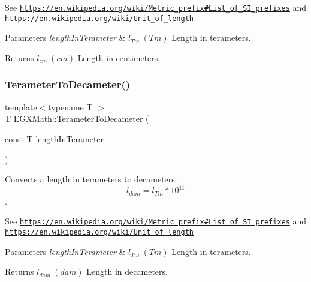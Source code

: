 See \href{https://en.wikipedia.org/wiki/Metric_prefix#List_of_SI_prefixes}{\tt https\+://en.\+wikipedia.\+org/wiki/\+Metric\+\_\+prefix\#\+List\+\_\+of\+\_\+\+S\+I\+\_\+prefixes} and \href{https://en.wikipedia.org/wiki/Unit_of_length}{\tt https\+://en.\+wikipedia.\+org/wiki/\+Unit\+\_\+of\+\_\+length} 
\begin{DoxyParams}{Parameters}
{\em length\+In\+Terameter} & $ l_{Tm}\ (Tm)$ Length in terameters. \\
\hline
\end{DoxyParams}
\begin{DoxyReturn}{Returns}
$ l_{cm}\ (cm)$ Length in centimeters. 
\end{DoxyReturn}
\mbox{\label{group___e_g_x_math-_conversions-_length_conversions-_s_i-_terameter-_s_i_gae7e3fac4aa8882fee314a52fb4466fd2}} 
\subsubsection{\texorpdfstring{Terameter\+To\+Decameter()}{TerameterToDecameter()}}
{\footnotesize\ttfamily template$<$typename T $>$ \\
T E\+G\+X\+Math\+::\+Terameter\+To\+Decameter (\begin{DoxyParamCaption}\item[{const T}]{length\+In\+Terameter }\end{DoxyParamCaption})}



Converts a length in terameters to decameters. \[ l_{dam}=l_{Tm} * 10^{11} \]. 

See \href{https://en.wikipedia.org/wiki/Metric_prefix#List_of_SI_prefixes}{\tt https\+://en.\+wikipedia.\+org/wiki/\+Metric\+\_\+prefix\#\+List\+\_\+of\+\_\+\+S\+I\+\_\+prefixes} and \href{https://en.wikipedia.org/wiki/Unit_of_length}{\tt https\+://en.\+wikipedia.\+org/wiki/\+Unit\+\_\+of\+\_\+length} 
\begin{DoxyParams}{Parameters}
{\em length\+In\+Terameter} & $ l_{Tm}\ (Tm)$ Length in terameters. \\
\hline
\end{DoxyParams}
\begin{DoxyReturn}{Returns}
$ l_{dam}\ (dam)$ Length in decameters. 
\end{DoxyReturn}
\mbox{\label{group___e_g_x_math-_conversions-_length_conversions-_s_i-_terameter-_s_i_ga988c084c9508f38112e2e39ed74782d5}} 
